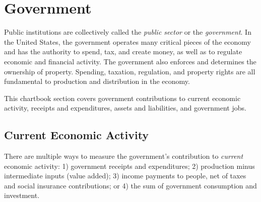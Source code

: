 \begin{minipage}{0.82\textwidth}
\vspace{-1.5mm}

\begin{tikzpicture}

\end{tikzpicture}
\vspace{-3mm}

\end{minipage}
\newpage
\thispagestyle{sectpage}

%
%
\hypertarget{gov}{\label{gov}} \hypertarget{govce}{\label{govce}}
\section*{Government} 
\begin{minipage}{0.76\textwidth}
\small Public institutions are collectively called the \textit{public sector} or the \textit{government}. In the United States, the government operates many critical pieces of the economy and has the authority to spend, tax, and create money, as well as to regulate economic and financial activity. The government also enforces and determines the ownership of property. Spending, taxation, regulation, and property rights are all fundamental to production and distribution in the economy.

This chartbook section covers government contributions to current economic activity, receipts and expenditures, assets and liabilities, and government jobs.
\end{minipage}

\subsection*{Current Economic Activity}
\begin{minipage}{0.76\textwidth}
\vspace{-1mm}

\small There are multiple ways to measure the government's contribution to \textit{current} economic activity: 1) government receipts and expenditures; 2) production minus intermediate inputs (value added); 3) income payments to people, net of taxes and social insurance contributions; or 4) the sum of government consumption and investment. 
\end{minipage}

